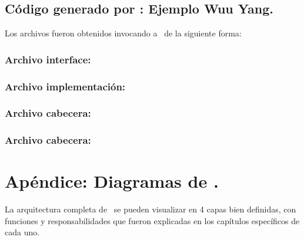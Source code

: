 \section{Código generado por \maggen: Ejemplo Wuu Yang.}
\label{append:agwuuyangcode}

Los archivos fueron obtenidos invocando a \maggen\ de la siguiente forma:

\begin{center}
\footnotesize{}
\end{center}

\subsection{Archivo interface: }
\label{append:maggenhpp}


\subsection{Archivo implementación: }
\label{append:maggencpp}


\subsection{Archivo cabecera: }
\label{append:nodehpp}


\subsection{Archivo cabecera: }
\label{append:planhpp}


\chapter{Apéndice: Diagramas de \maggen.}
\label{chap:appendisemaggen}
La arquitectura completa de \maggen\ se pueden visualizar en 4 capas bien definidas, con funciones y responsabilidades que fueron explicadas en los capítulos específicos de cada uno.

